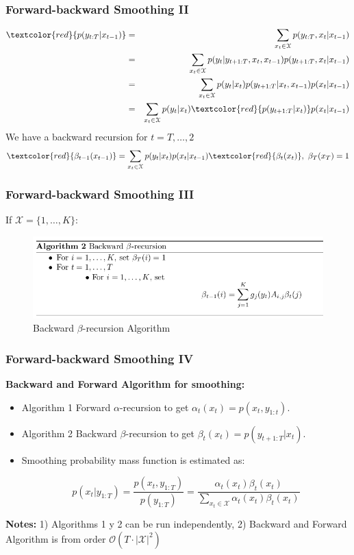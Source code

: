 \documentclass[xcolor=dvipsnames, compress]{beamer}
\begin{document}
\begin{frame}
\frametitle{Forward-backward Smoothing II}
\hspace{-0.2cm}
\begin{eqnarray*}
\textcolor{red}{p(y_{t	:T} |x_{t-1} )} & = & \sum_{x_t \in \mathcal{X}} p(y_{t:T},x_t |x_{t-1} )\\
                       & = & \sum_{x_t \in \mathcal{X}} p(y_{t}|y_{t+1:T},x_t,x_{t-1}) p(y_{t+1:T},x_t |x_{t-1} ) \\
     & = & \sum_{x_t \in \mathcal{X}} p(y_{t}|x_{t}) p(y_{t+1:T}|x_t,x_{t-1}) p(x_{t}|x_{t-1}) \\
     & = & \sum_{x_t \in \mathcal{X}} p(y_{t}|x_t) \textcolor{red}{p(y_{t+1:T}|x_t)} p(x_{t}|x_{t-1}) 
\end{eqnarray*}
We have a backward recursion for $t=T, \ldots, 2$
$$ \textcolor{red}{\beta_{t-1}(x_{t-1})} = \sum_{x_t \in \mathcal{X}} p(y_{t}|x_t)  p(x_{t}|x_{t-1}) \textcolor{red}{\beta_t(x_t)}, \mbox{ } \beta_T(x_T)=1 $$
\end{frame}

\begin{frame}
\frametitle{Forward-backward Smoothing III}

If $\mathcal{X}=\{1,\ldots, K\}$:
\begin{figure}
	\includegraphics[scale=0.45]{images/backward_beta_recursion.jpg}
	\caption{Backward $\beta$-recursion Algorithm}
\end{figure}
\end{frame}

\begin{frame}
\frametitle{Forward-backward Smoothing IV}
\textbf{Backward and Forward Algorithm for smoothing:}

\begin{itemize}
	\item Algorithm 1 Forward $\alpha$-recursion to get $\alpha_t(x_t)=p(x_t , y_{1:t})$.
	\item Algorithm 2 Backward $\beta$-recursion to get $\beta_t(x_t)=p(y_{t+1:T} |x_t )$.
	\item Smoothing probability mass function is estimated as:
	
	$$ p(x_t | y_{1:T}) = \frac{p(x_t, y_{1:T})}{p(y_{1:T})}=\frac{\alpha_t(x_t) \beta_t(x_t)}{\sum_{x_t \in \mathcal{X}} \alpha_t(x_t) \beta_t(x_t)}$$

\end{itemize}
\vspace{0.5cm}
 \textbf{Notes:} 1) Algorithms 1 y 2 can be run independently, 2) Backward and Forward Algorithm is from order $\mathcal{O}(T\cdot|\mathcal{X}|^2)$

\end{frame}
\end{document}
